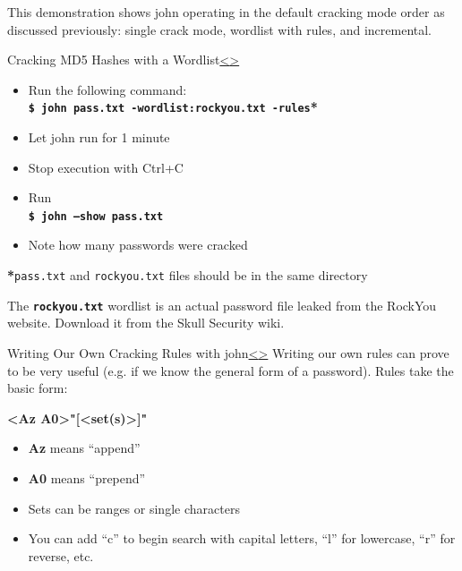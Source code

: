 \documentclass[12pt]{extarticle}
\newcommand{\code}[1]{\texttt{\bfseries#1}}
\newenvironment{instructionblock}{\Large\bgroup}{\egroup}
\begin{document}
This demonstration shows john operating in the default cracking mode order as discussed previously: single crack mode, wordlist with rules, and incremental.

\pagebreak
\begin{slide}{Cracking MD5 Hashes with a Wordlist}{\hyperref[slide 10]{\textless}\hyperref[slide 12]{\textgreater}}
	\vskip 10pt
	\begin{instructionblock}
		\begin{itemize}
			\item Run the following command:\\
				\code{\$ john pass.txt -wordlist:rockyou.txt -rules}\textbf{*}
			\item Let john run for 1 minute
			\item Stop execution with Ctrl+C
			\item Run \\
				\code{\$ john --show pass.txt}
			\item Note how many passwords were cracked
		\end{itemize}
	\end{instructionblock}
\end{slide}
\textbf{*}\texttt{pass.txt} and \texttt{rockyou.txt} files should be in the same directory
\vfill

The \code{rockyou.txt} wordlist is an actual password file leaked from the RockYou website. Download it from the Skull Security wiki. \cite{rockyou}

\pagebreak
\begin{slide}{Writing Our Own Cracking Rules with john}{\hyperref[slide 11]{\textless}\hyperref[slide 13]{\textgreater}}
	\begin{instructionblock}
	Writing our own rules can prove to be very useful (e.g. if we know the general form of a password). Rules take the basic form: 
		
			\hskip 50pt \textbf{\textless Az \textbar  A0\textgreater"[\textless set(s)\textgreater ]"}

		\begin{itemize}
			\item \textbf{Az} means ``append''
			\item \textbf{A0} means ``prepend''
			\item Sets can be ranges or single characters
			\item You can add ``c'' to begin search with capital letters, ``l'' for lowercase, ``r'' for reverse, etc. \cite{cheat}
			
		\end{itemize}
	\end{instructionblock}
\end{slide}
\vfill
\end{document}
